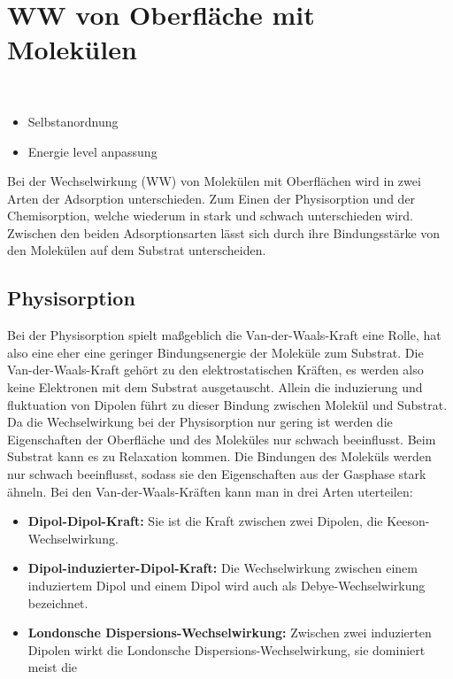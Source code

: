     \section{WW von Oberfläche mit Molekülen}
       ~\cite{ma-DJ}
        \begin{itemize}
            \item Selbstanordnung
            \item Energie level anpassung
        \end{itemize}
        Bei der Wechselwirkung (WW) von Molekülen mit Oberflächen wird in zwei Arten der Adsorption unterschieden. 
        Zum Einen der Physisorption und der Chemisorption, welche wiederum in stark und schwach unterschieden wird.
        Zwischen den beiden Adsorptionsarten lässt sich durch ihre Bindungsstärke von den Molekülen auf dem Substrat unterscheiden.

        \subsection{Physisorption}
            Bei der Physisorption spielt maßgeblich die Van-der-Waals-Kraft eine Rolle, hat also eine eher eine geringer Bindungsenergie der Moleküle zum Substrat.
            Die Van-der-Waals-Kraft gehört zu den elektrostatischen Kräften, es werden also keine Elektronen mit dem Substrat ausgetauscht.
            Allein die induzierung und fluktuation von Dipolen führt zu dieser Bindung zwischen Molekül und Substrat.
            Da die Wechselwirkung bei der Physisorption nur gering ist werden die Eigenschaften der Oberfläche und des Moleküles nur schwach beeinflusst.
            Beim Substrat kann es zu Relaxation kommen.
            Die Bindungen des Moleküls werden nur schwach beeinflusst, sodass sie den Eigenschaften aus der Gasphase stark ähneln.
            Bei den Van-der-Waals-Kräften kann man in drei Arten uterteilen:
            \begin{itemize}
                \item \textbf{Dipol-Dipol-Kraft:} Sie ist die Kraft zwischen zwei Dipolen, die Keeson-Wechselwirkung.
                \item \textbf{Dipol-induzierter-Dipol-Kraft:} Die Wechselwirkung zwischen einem induziertem Dipol und einem Dipol wird auch als Debye-Wechselwirkung bezeichnet.
                \item \textbf{Londonsche Dispersions-Wechselwirkung:} Zwischen zwei induzierten Dipolen wirkt die Londonsche Dispersions-Wechselwirkung, sie dominiert meist die 
            \end{itemize}
        
